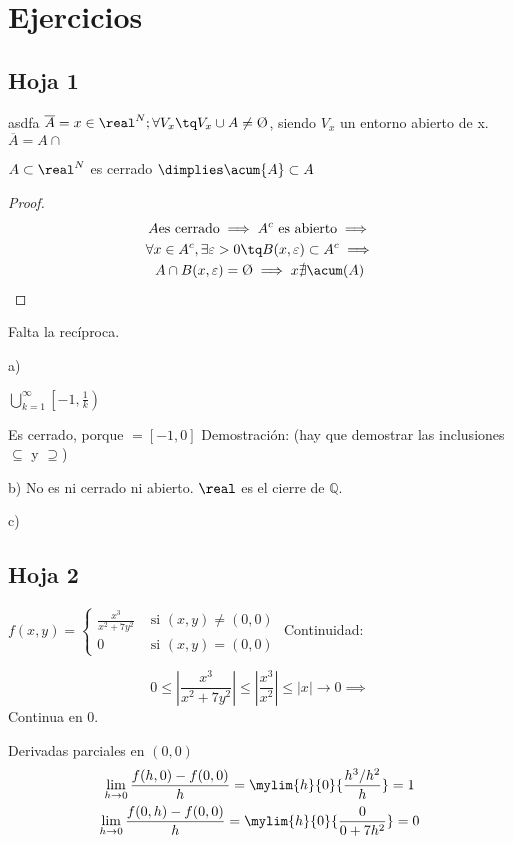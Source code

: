 \section{Ejercicios}

\subsection{Hoja 1}

\begin{problem}[?]
asdfa
\solution
$\overline{A} = { x \in \real^N; \forall V_x \tq V_x \cup A \neq \text{\O}}$, siendo $V_x$ un entorno abierto de x.
	$\overline{A} = A \cap $ 
	
$A \subset \real^N$ es cerrado $\dimplies \acum{A}\subset A$ 
 
\end{problem}
\begin{proof}
\begin{gather*}
A \text{es cerrado} \implies A^c \text{ es abierto} \implies\\
\forall x \in A^c, \exists \varepsilon > 0 \tq B(x,\varepsilon) \subset A^c \implies\\
A \cap B(x,\varepsilon) = \text{\O} \implies x \nexists \acum(A) 
\end{gather*}
\end{proof}
Falta la recíproca.


\begin{problem}[3] 
\solution
a)

$\displaystyle\bigcup_{k=1}^{\infty} \left[-1,\frac{1}{k}\right)$

Es cerrado, porque $=[-1,0]$
Demostración: (hay que demostrar las inclusiones $\subseteq$ y $\supseteq$)

b)
No es ni cerrado ni abierto.
\obs $\real$ es el cierre de $\mathbb{Q}$.

c)
 
\end{problem}

\newpage
\subsection{Hoja 2}

\begin{problem}[?]
\solution
$f(x,y) = \left\{\begin{matrix}
                \displaystyle \frac{x^3}{x^2+7y^2} & \text{ si } (x,y) \neq (0,0)\\
                 0 & \text{ si } (x,y) = (0,0)
                \end{matrix}\right.$
Continuidad:

$$0\leq \left| \frac{x^3}{x^2+7y^2} \right| \leq \left| \frac{x^3}{x^2} \right| \leq |x| \rightarrow 0 \implies$$ Continua en 0.

Derivadas parciales en $(0,0)$
\begin{gather*}
\lim_{h \to 0} {\frac{f(h,0) - f(0,0)}{h}} = \mylim{h}{0} {\displaystyle\frac{{h^{3}}/{h^{2}}}{h}} = 1\\
\lim_{h\to 0} {\frac{f(0,h) - f(0,0)}{h}} = \mylim{h}{0} {\frac{0}{0+7h^2}} = 0
\end{gather*}
\end{problem}
 
